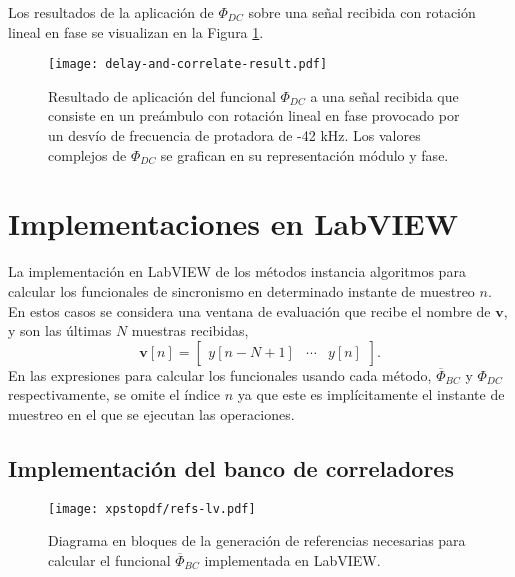 Los resultados de la aplicación de $\Phi_{DC}$ sobre una señal recibida con rotación lineal en fase se visualizan en la Figura \ref{fig:dac-result}.
\begin{figure}[t]
    \centering{}\texttt{[image: delay-and-correlate-result.pdf]}
    \caption[Aplicación del \color{RoyalBlue} funcional \color{black} $\Phi_{DC}$ a una señal recibida con error en frecuencia.]{Resultado de aplicación del \color{RoyalBlue} funcional \color{black} $\Phi_{DC}$ a una señal recibida que consiste en un preámbulo con rotación lineal en fase provocado por un desvío de frecuencia de protadora de -42 kHz. \color{Red} Los valores complejos de $\Phi_{DC}$ se grafican en su representación módulo y fase.\color{black}\label{fig:dac-result}}  
\end{figure}


\section{Implementaciones en LabVIEW}
\label{Ss:ch3-labview}

La implementación en LabVIEW de los métodos instancia algoritmos para calcular los \color{RoyalBlue} funcionales \color{black} de sincronismo en determinado instante de muestreo $n$. En estos casos se considera una ventana de evaluación que recibe el nombre de $\mathbf{v}$, y son las últimas $N$ muestras recibidas,
\color{Red}
\begin{equation}
    \mathbf{v}[n] = 
    \begin{bmatrix}
        y[n-N+1] &  \cdots & y[n]
    \end{bmatrix}.
\end{equation}
\color{black}
En las expresiones para calcular los \color{RoyalBlue} funcionales \color{black} usando cada método, $\overline{\Phi}_{BC}$ y $\Phi_{DC}$ respectivamente, se omite el índice $n$ ya que este es implícitamente el instante de muestreo en el que se ejecutan las operaciones. 


\subsection{Implementación del banco de correladores}

\begin{figure}[t]
    \centering{}\texttt{[image: xpstopdf/refs-lv.pdf]}
    \caption[Diagrama dn bloques de la generación de la matriz de referencias implementada en LabVIEW.]{Diagrama en bloques de la generación de referencias necesarias para calcular el \color{RoyalBlue} funcional \color{black} $\overline{\Phi}_{BC}$ implementada en LabVIEW.\label{fig:refs_lv}}  
\end{figure}

